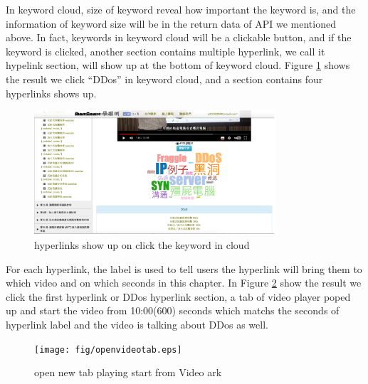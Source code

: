 In keyword cloud, size of keyword reveal how important the keyword is, and the information of keyword size will be in the return data of API we mentioned above.
In fact, keywords in keyword cloud will be a clickable button, and if the keyword is clicked, another section contains multiple hyperlink, we call it hypelink section, will show up at the bottom of keyword cloud.
Figure \ref{fig:keywordurl} shows the result we click ``DDos'' in keyword cloud, and a section contains four hyperlinks shows up.
\begin{figure}[H]
    \centering
    \includegraphics[width = 0.8\textwidth]{fig/keywordurl.eps}
    \caption{hyperlinks show up on click the keyword in cloud}
    \label{fig:keywordurl}
\end{figure}

For each hyperlink, the label is used to tell users the hyperlink will bring them to which video and on which seconds in this chapter.
In Figure \ref{fig:openvideotab} show the result we click the first hyperlink or DDos hyperlink section, a tab of video player poped up and start the video from 10:00(600) seconds which matchs the seconds of hyperlink label and the video is talking about DDos as well.

\begin{figure}[H]
    \centering
    \texttt{[image: fig/openvideotab.eps]}
    \caption{open new tab playing start from Video ark}
    \label{fig:openvideotab}
\end{figure}

